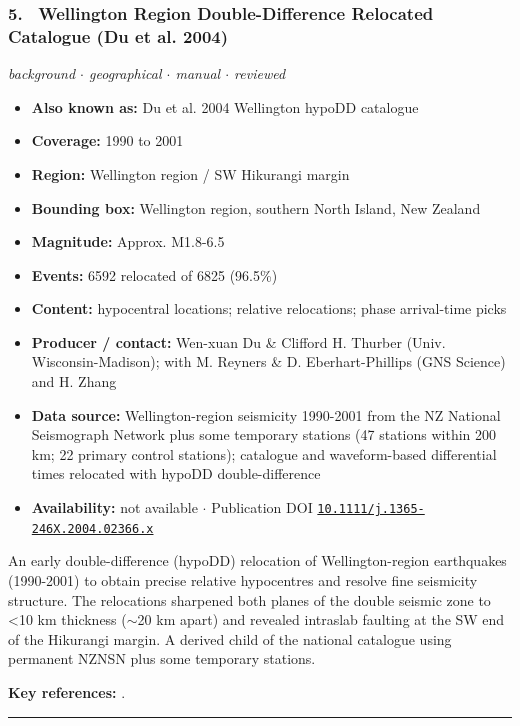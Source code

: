 \documentclass[10pt,a4paper]{article}
\newcommand{\catentryrule}{\par\vspace{3pt}\noindent\textcolor{rulegrey}{\rule{\linewidth}{0.3pt}}\par\vspace{5pt}}
\newcommand{\kv}[2]{\item \textbf{#1:} #2}
\begin{document}
\subsubsection*{\hypertarget{c:5}{5.}~ Wellington Region Double-Difference Relocated Catalogue (Du et al. 2004)}
{\small\itshape background $\cdot$ geographical $\cdot$ manual $\cdot$ reviewed}\par\vspace{2pt}
\begin{itemize}[leftmargin=1.3em,itemsep=0.6pt,topsep=1pt,parsep=0pt]
\kv{Also known as}{Du et al. 2004 Wellington hypoDD catalogue}
\kv{Coverage}{1990 to 2001}
\kv{Region}{Wellington region / SW Hikurangi margin}
\kv{Bounding box}{Wellington region, southern North Island, New Zealand}
\kv{Magnitude}{Approx. M1.8-6.5}
\kv{Events}{6592 relocated of 6825 (96.5\%)}
\kv{Content}{hypocentral locations; relative relocations; phase arrival-time picks}
\kv{Producer / contact}{Wen-xuan Du \& Clifford H. Thurber (Univ. Wisconsin-Madison); with M. Reyners \& D. Eberhart-Phillips (GNS Science) and H. Zhang}
\kv{Data source}{Wellington-region seismicity 1990-2001 from the NZ National Seismograph Network plus some temporary stations (47 stations within 200 km; 22 primary control stations); catalogue and waveform-based differential times relocated with hypoDD double-difference}
\kv{Availability}{not available $\cdot$ Publication DOI \href{https://doi.org/10.1111/j.1365-246X.2004.02366.x}{\nolinkurl{10.1111/j.1365-246X.2004.02366.x}}}
\end{itemize}
\par\vspace{2pt}An early double-difference (hypoDD) relocation of Wellington-region earthquakes (1990-2001) to obtain precise relative hypocentres and resolve fine seismicity structure. The relocations sharpened both planes of the double seismic zone to \textless{}10 km thickness ($\sim$20 km apart) and revealed intraslab faulting at the SW end of the Hikurangi margin. A derived child of the national catalogue using permanent NZNSN plus some temporary stations.
\par\vspace{2pt}\textbf{Key references:} \cite{Du2004}.
\catentryrule
\end{document}
